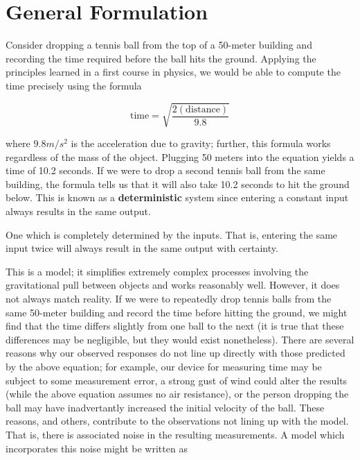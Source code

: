 \documentclass[]{book}
\theoremstyle{plain}
\theoremstyle{mydefn}
\theoremstyle{myexmpl}
\theoremstyle{remark}
\let\BeginKnitrBlock\begin \let\EndKnitrBlock\end
\let\BeginKnitrBlock\begin \let\EndKnitrBlock\end
\begin{document}
\section{General Formulation}\label{general-formulation}

Consider dropping a tennis ball from the top of a 50-meter building and
recording the time required before the ball hits the ground. Applying
the principles learned in a first course in physics, we would be able to
compute the time precisely using the formula

\[\text{time} = \sqrt{\frac{2(\text{distance})}{9.8}}\]

where \(9.8 m/s^2\) is the acceleration due to gravity; further, this
formula works regardless of the mass of the object. Plugging 50 meters
into the equation yields a time of 10.2 seconds. If we were to drop a
second tennis ball from the same building, the formula tells us that it
will also take 10.2 seconds to hit the ground below. This is known as a
\textbf{deterministic} system since entering a constant input always
results in the same output.

\BeginKnitrBlock{definition}[Deterministic Process]
\protect\hypertarget{def:defn-deterministic-process}{}{\label{def:defn-deterministic-process}
{} }One which is completely
determined by the inputs. That is, entering the same input twice will
always result in the same output with certainty.
\EndKnitrBlock{definition}

This is a model; it simplifies extremely complex processes involving the
gravitational pull between objects and works reasonably well. However,
it does not always match reality. If we were to repeatedly drop tennis
balls from the same 50-meter building and record the time before hitting
the ground, we might find that the time differs slightly from one ball
to the next (it is true that these differences may be negligible, but
they would exist nonetheless). There are several reasons why our
observed responses do not line up directly with those predicted by the
above equation; for example, our device for measuring time may be
subject to some measurement error, a strong gust of wind could alter the
results (while the above equation assumes no air resistance), or the
person dropping the ball may have inadvertantly increased the initial
velocity of the ball. These reasons, and others, contribute to the
observations not lining up with the model. That is, there is associated
noise in the resulting measurements. A model which incorporates this
noise might be written as
\end{document}
